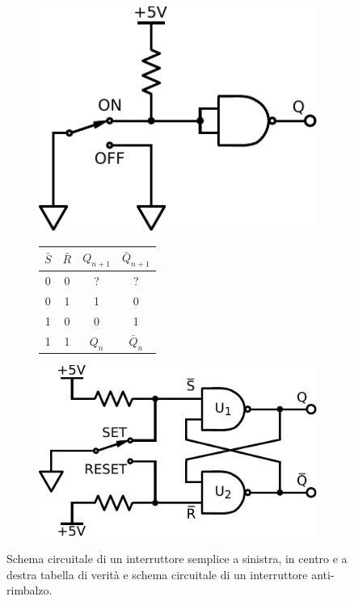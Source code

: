 \begin{figure}[htpc]
\centering
        \begin{subfigure}[hc]{.3\textwidth}
		\centering
		\includegraphics[width=.7\textwidth]{../E11/latex/rimbalzo.pdf}
		\caption{}
		\label{cir11:rimb}
        \end{subfigure}
	\begin{subfigure}[hc]{.3\textwidth}
		\centering
		{\renewcommand{\arraystretch}{1.2}%
		\begin{tabular}{|c|c|c|c|}
		\hline
		$\bar S$ & $\bar R$ & $Q_{n+1}$ & $\bar Q_{n+1}$  \\
		\hline
		0 & 0  & ?&?\\
		\hline
		0&1 & 1 & 0\\
		\hline
		1&0 & 0  &1\\
		\hline
		1&1 & $Q_n$ & $\bar Q_n$\\
		\hline
		\end{tabular}}
		\caption{}
		\label{tab11:antirimb}
        \end{subfigure}
        \begin{subfigure}[hc]{.3\textwidth}
		\centering
		\includegraphics[width=.9\textwidth]{../E11/latex/anti-rimbalzo.pdf}
		\caption{}
		\label{cir11:no-rimb}
        \end{subfigure}
\caption{Schema circuitale di un interruttore semplice a sinistra, in centro e a destra tabella di verità e schema circuitale di un interruttore anti-rimbalzo.}
\end{figure}

